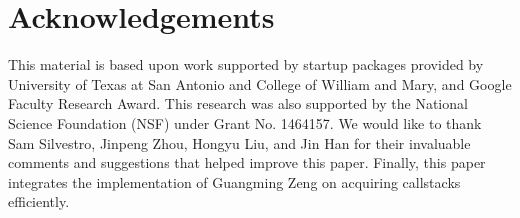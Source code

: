 \section*{Acknowledgements}

This material is based upon work supported by %
startup packages provided by University of Texas at San Antonio and College of William and Mary, and Google Faculty Research Award. This research was also supported by the National Science Foundation (NSF) under Grant No. 1464157. We would like to thank Sam Silvestro, Jinpeng Zhou, Hongyu Liu, and Jin Han for their invaluable comments and suggestions that helped improve this paper. Finally, this paper integrates the implementation of Guangming Zeng on acquiring callstacks efficiently.